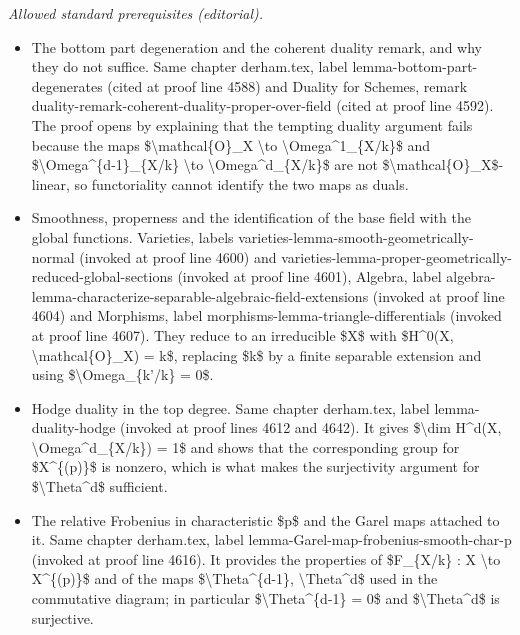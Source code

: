 \documentclass[10pt,a4paper]{amsart}
\theoremstyle{plain}
\theoremstyle{definition}
\theoremstyle{remark}
\numberwithin{equation}{subsection}
\begin{document}
\noindent\textit{Allowed standard prerequisites (editorial).}\begin{itemize}
\item The bottom part degeneration and the coherent duality remark, and why they do not suffice. Same chapter derham.tex, label lemma-bottom-part-degenerates (cited at proof line 4588) and Duality for Schemes, remark duality-remark-coherent-duality-proper-over-field (cited at proof line 4592). The proof opens by explaining that the tempting duality argument fails because the maps \$\textbackslash{}mathcal\{O\}\_X \textbackslash{}to \textbackslash{}Omega\textasciicircum{}1\_\{X/k\}\$ and \$\textbackslash{}Omega\textasciicircum{}\{d-1\}\_\{X/k\} \textbackslash{}to \textbackslash{}Omega\textasciicircum{}d\_\{X/k\}\$ are not \$\textbackslash{}mathcal\{O\}\_X\$-linear, so functoriality cannot identify the two maps as duals.
\item Smoothness, properness and the identification of the base field with the global functions. Varieties, labels varieties-lemma-smooth-geometrically-normal (invoked at proof line 4600) and varieties-lemma-proper-geometrically-reduced-global-sections (invoked at proof line 4601), Algebra, label algebra-lemma-characterize-separable-algebraic-field-extensions (invoked at proof line 4604) and Morphisms, label morphisms-lemma-triangle-differentials (invoked at proof line 4607). They reduce to an irreducible \$X\$ with \$H\textasciicircum{}0(X, \textbackslash{}mathcal\{O\}\_X) = k\$, replacing \$k\$ by a finite separable extension and using \$\textbackslash{}Omega\_\{k'/k\} = 0\$.
\item Hodge duality in the top degree. Same chapter derham.tex, label lemma-duality-hodge (invoked at proof lines 4612 and 4642). It gives \$\textbackslash{}dim H\textasciicircum{}d(X, \textbackslash{}Omega\textasciicircum{}d\_\{X/k\}) = 1\$ and shows that the corresponding group for \$X\textasciicircum{}\{(p)\}\$ is nonzero, which is what makes the surjectivity argument for \$\textbackslash{}Theta\textasciicircum{}d\$ sufficient.
\item The relative Frobenius in characteristic \$p\$ and the Garel maps attached to it. Same chapter derham.tex, label lemma-Garel-map-frobenius-smooth-char-p (invoked at proof line 4616). It provides the properties of \$F\_\{X/k\} : X \textbackslash{}to X\textasciicircum{}\{(p)\}\$ and of the maps \$\textbackslash{}Theta\textasciicircum{}\{d-1\}, \textbackslash{}Theta\textasciicircum{}d\$ used in the commutative diagram; in particular \$\textbackslash{}Theta\textasciicircum{}\{d-1\} = 0\$ and \$\textbackslash{}Theta\textasciicircum{}d\$ is surjective.

\end{itemize}
\end{document}
